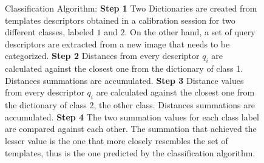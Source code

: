 \begin{figure}[h!]
\centering
{}
\caption[NBNN Classification]{Classification Algorithm: \textbf{Step 1} Two Dictionaries are created from templates descriptors obtained in a calibration session for two different classes, labeled $1$ and $2$. On the other hand, a set of query descriptors are extracted from a new image that needs to be categorized. \textbf{Step 2} Distances from every descriptor $q_i$ are calculated against the closest one from the dictionary of class 1.  Distances summations are accumulated. \textbf{Step 3} Distance values from every descriptor $q_i$ are calculated against the closest one from the dictionary of class 2, the other class.  Distances summations are accumulated. \textbf{Step 4 }The two summation values for each class label are compared against each other. The summation that achieved the lesser value is the one that more closely resembles the set of templates, thus is the one predicted by the classification algorithm.}
\label{fig:nbnnclassification}
\end{figure}

